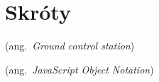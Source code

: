 \chapter*{Skróty}\mbox{}
\label{sec:skroty}
\noindent
\begin{description}[labelwidth=*]
  \item [GCS] (ang.\ \emph{Ground control station}) %
  \item [JSON] (ang.\ \emph{JavaScript Object Notation})
\end{description}
